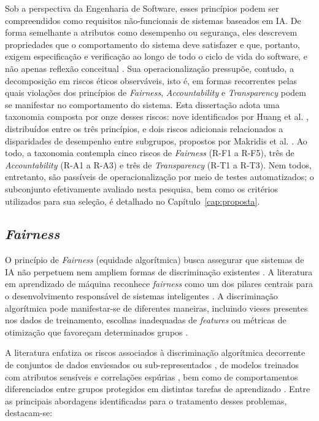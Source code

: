 Sob a perspectiva da Engenharia de Software, esses princípios podem ser compreendidos como requisitos não-funcionais de sistemas baseados em IA. De forma semelhante a atributos como desempenho ou segurança, eles descrevem propriedades que o comportamento do sistema deve satisfazer e que, portanto, exigem especificação e verificação ao longo de todo o ciclo de vida do software, e não apenas reflexão conceitual \cite{Aydemir2018, Morley2020}. Sua operacionalização pressupõe, contudo, a decomposição em riscos éticos observáveis, isto é, em formas recorrentes pelas quais violações dos princípios de \textit{Fairness}, \textit{Accountability} e \textit{Transparency} podem se manifestar no comportamento do sistema. Esta dissertação adota uma taxonomia composta por onze desses riscos: nove identificados por Huang et al. \cite{Huang2023}, distribuídos entre os três princípios, e dois riscos adicionais relacionados a disparidades de desempenho entre subgrupos, propostos por Makridis et al. \cite{Makridis2024}. Ao todo, a taxonomia contempla cinco riscos de \textit{Fairness} (R-F1 a R-F5), três de \textit{Accountability} (R-A1 a R-A3) e três de \textit{Transparency} (R-T1 a R-T3). Nem todos, entretanto, são passíveis de operacionalização por meio de testes automatizados; o subconjunto efetivamente avaliado nesta pesquisa, bem como os critérios utilizados para sua seleção, é detalhado no Capítulo~\ref{cap:proposta}.

\subsection{\textit{Fairness}}
\label{sec:fairness}

O princípio de \textit{Fairness} (equidade algorítmica) busca assegurar que sistemas de IA não perpetuem nem ampliem formas de discriminação existentes \cite{Mehrabi2021,Barocas2016}. A literatura em aprendizado de máquina reconhece \textit{fairness} como um dos pilares centrais para o desenvolvimento responsável de sistemas inteligentes \cite{Corbett-Davies2023,Mitchell2021}. A discriminação algorítmica pode manifestar-se de diferentes maneiras, incluindo vieses presentes nos dados de treinamento, escolhas inadequadas de \textit{features} ou métricas de otimização que favoreçam determinados grupos \cite{Mehrabi2021, Barocas2016}.

A literatura enfatiza os riscos associados à discriminação algorítmica decorrente de conjuntos de dados enviesados ou sub-representados \cite{Mehrabi2021, S003, S034}, de modelos treinados com atributos sensíveis e correlações espúrias \cite{Barocas2016, S015}, bem como de comportamentos diferenciados entre grupos protegidos em distintas tarefas de aprendizado \cite{Corbett-Davies2023, S034}. Entre as principais abordagens identificadas para o tratamento desses problemas, destacam-se:

